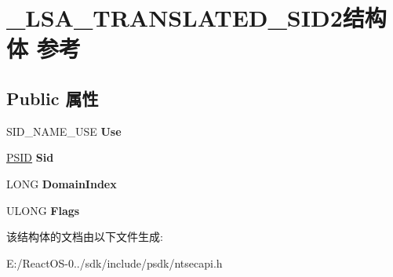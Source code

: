 \hypertarget{struct___l_s_a___t_r_a_n_s_l_a_t_e_d___s_i_d2}{}\section{\+\_\+\+L\+S\+A\+\_\+\+T\+R\+A\+N\+S\+L\+A\+T\+E\+D\+\_\+\+S\+I\+D2结构体 参考}
\label{struct___l_s_a___t_r_a_n_s_l_a_t_e_d___s_i_d2}
\subsection*{Public 属性}
\begin{DoxyCompactItemize}
\item 
\mbox{\label{struct___l_s_a___t_r_a_n_s_l_a_t_e_d___s_i_d2_a6e64f80b550f237f714bdc160ad0ac1e}} 
S\+I\+D\+\_\+\+N\+A\+M\+E\+\_\+\+U\+SE {\bfseries Use}
\item 
\mbox{\label{struct___l_s_a___t_r_a_n_s_l_a_t_e_d___s_i_d2_a7774a4648cbfe028949cd48d5024d6d2}} 
\hyperlink{struct___s_i_d}{P\+S\+ID} {\bfseries Sid}
\item 
\mbox{\label{struct___l_s_a___t_r_a_n_s_l_a_t_e_d___s_i_d2_aba899c70f6bc891698d7bff2191828c5}} 
L\+O\+NG {\bfseries Domain\+Index}
\item 
\mbox{\label{struct___l_s_a___t_r_a_n_s_l_a_t_e_d___s_i_d2_a3e4b541595d53c8be03308839a93951b}} 
U\+L\+O\+NG {\bfseries Flags}
\end{DoxyCompactItemize}


该结构体的文档由以下文件生成\+:\begin{DoxyCompactItemize}
\item 
E\+:/\+React\+O\+S-\/0../sdk/include/psdk/ntsecapi.\+h\end{DoxyCompactItemize}
